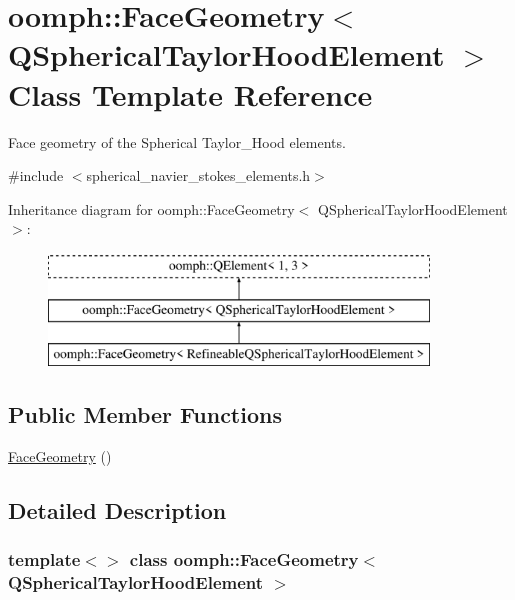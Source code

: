 \hypertarget{classoomph_1_1FaceGeometry_3_01QSphericalTaylorHoodElement_01_4}{}\section{oomph\+:\+:Face\+Geometry$<$ Q\+Spherical\+Taylor\+Hood\+Element $>$ Class Template Reference}
\label{classoomph_1_1FaceGeometry_3_01QSphericalTaylorHoodElement_01_4}


Face geometry of the Spherical Taylor\+\_\+\+Hood elements.  




{\ttfamily \#include $<$spherical\+\_\+navier\+\_\+stokes\+\_\+elements.\+h$>$}

Inheritance diagram for oomph\+:\+:Face\+Geometry$<$ Q\+Spherical\+Taylor\+Hood\+Element $>$\+:\begin{figure}[H]
\begin{center}
\leavevmode
\includegraphics[height=3.000000cm]{classoomph_1_1FaceGeometry_3_01QSphericalTaylorHoodElement_01_4}
\end{center}
\end{figure}
\subsection*{Public Member Functions}
\begin{DoxyCompactItemize}
\item 
\hyperlink{classoomph_1_1FaceGeometry_3_01QSphericalTaylorHoodElement_01_4_ace78b3c8f3f172c81767f5b386783da2}{Face\+Geometry} ()
\end{DoxyCompactItemize}


\subsection{Detailed Description}
\subsubsection*{template$<$$>$\newline
class oomph\+::\+Face\+Geometry$<$ Q\+Spherical\+Taylor\+Hood\+Element $>$}

